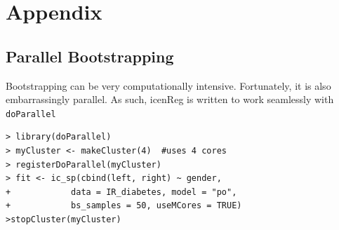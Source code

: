 \documentclass[a4paper]{article}
\begin{document}
  
  

  
  
  
  
  \section{Appendix}
  
  \subsection{Parallel Bootstrapping}
  
 
Bootstrapping can be very computationally intensive. Fortunately, it is also embarrassingly parallel. As such, icenReg is written to work seamlessly with \texttt{doParallel}
  
\begin{verbatim}
> library(doParallel)
> myCluster <- makeCluster(4)  #uses 4 cores
> registerDoParallel(myCluster)
> fit <- ic_sp(cbind(left, right) ~ gender,
+            data = IR_diabetes, model = "po",
+            bs_samples = 50, useMCores = TRUE)
>stopCluster(myCluster)
\end{verbatim}
  
  
\end{document}
